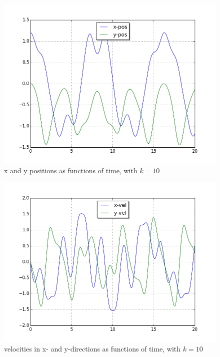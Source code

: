 \documentclass[a4paper,11pt]{article}
\theoremstyle{mytheor}
\begin{document}
\begin{figure}[!h]
\centering
\includegraphics[scale=0.5]{task1_k10_utdrag12_1.png}
\caption{x and y positions as functions of time, with $k = 10$}
\label{1k10}
\end{figure}

\begin{figure}[!h]
\centering
\includegraphics[scale=0.5]{task1_k10_utdrag12_2.png}
\caption{velocities in x- and y-directions as functions of time, with $k = 10$}
\label{2k10}
\end{figure}
\end{document}
